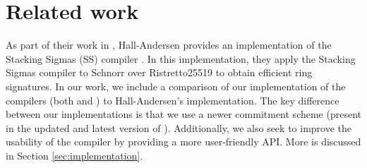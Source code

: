 \section{Related work}
\label{sec:related_work}
As part of their work in \cite{StackingSigmas}, Hall-Andersen provides an implementation of the Stacking Sigmas (SS) compiler \cite{MHAStackSig}. 
In this implementation, they apply the Stacking Sigmas compiler to Schnorr over Ristretto25519 to obtain efficient ring signatures. 
In our work, we include a comparison of our implementation of the compilers (both \cite{CDS94} and \cite{StackingSigmas}) to Hall-Andersen's implementation. 
The key difference between our implementations is that we use a newer commitment scheme (present in the updated and latest version of 
\cite{StackingSigmas}). Additionally, we also seek to improve the usability of the compiler by providing a more user-friendly API. 
More is discussed in Section \ref{sec:implementation}.



